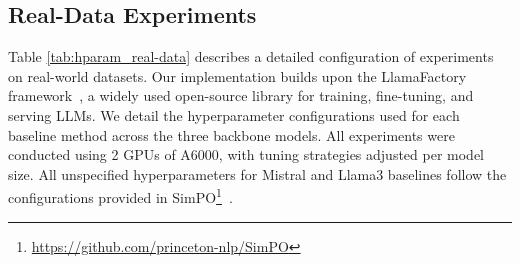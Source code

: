 \documentclass{article} %
\begin{document}
\subsection{Real-Data Experiments}
\label{appendix:details_real-data}

Table \ref{tab:hparam_real-data} describes a detailed configuration of experiments on real-world datasets. Our implementation builds upon the LlamaFactory framework~\citep{zheng2024llamafactory}, a widely used open-source library for training, fine-tuning, and serving LLMs. We detail the hyperparameter configurations used for each baseline method across the three backbone models. All experiments were conducted using 2 GPUs of A6000, with tuning strategies adjusted per model size. All unspecified hyperparameters for Mistral and Llama3 baselines follow the configurations provided in SimPO\footnote{\url{https://github.com/princeton-nlp/SimPO}}~\citep{meng2024simposimplepreferenceoptimization}.
\end{document}

